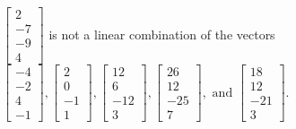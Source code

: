 \begin{exercise}
\begin{exerciseStatement}
  \end{exerciseStatement}
  \begin{exerciseAnswer}
   \(\left[\begin{array}{c}
2 \\
-7 \\
-9 \\
4
\end{array}\right]\) 
  	 is not  
	a linear combination of the vectors \(\left[\begin{array}{c}
-4 \\
-2 \\
4 \\
-1
\end{array}\right] , \left[\begin{array}{c}
2 \\
0 \\
-1 \\
1
\end{array}\right] , \left[\begin{array}{c}
12 \\
6 \\
-12 \\
3
\end{array}\right] , \left[\begin{array}{c}
26 \\
12 \\
-25 \\
7
\end{array}\right] , \text{ and } \left[\begin{array}{c}
18 \\
12 \\
-21 \\
3
\end{array}\right]\).

	
  


  \end{exerciseAnswer}
\end{exercise}